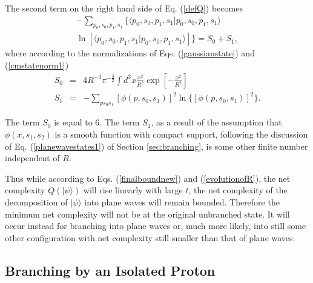 \documentclass[12pt,amsmath,amssymb,onecolumn]{revtex4-2}
\begin{document}
The second term on the right hand side of Eq. (\ref{defQ}) becomes
\begin{multline}
\label{entropy}
-\sum_{p_0, s_0, p_1, s_1} \{  \langle  p_0, s_0, p_1, s_1| p_0, s_0, p_1, s_1 \rangle  \\ \ln [  \langle  p_0, s_0, p_1, s_1| p_0, s_0, p_1,s_1 \rangle ] \} = 
S_0 + S_1,
\end{multline}
where according to the normalizations of Eqs. (\ref{gaussianstate}) and (\ref{cmstatenorm1})
\begin{subequations}
\begin{eqnarray}
\label{s0}
S_0 & = & 4 R^{-3} \pi^{-\frac{3}{2}} \int d^3 x \frac{x^2}{R^2}\exp[ -\frac{x^2}{R^2}] \\
\label{s1}
S_1 & = & -\sum_{p s_0 s_1} [ \phi( p, s_0, s_1)]^2 \ln\{ [ \phi( p, s_0, s_1)]^2 \}.
\end{eqnarray}
\end{subequations}

The term $S_0$ is equal to $6$. The term $S_1$, as a result of the assumption that $\phi( x, s_1, s_2)$ is 
a smooth function with compact support, following the discussion of Eq. (\ref{planewavestates1}) of Section \ref{sec:branching},
is some other finite number independent of $R$.

Thus while according to Eqs. (\ref{finalboundnew}) and (\ref{evolutionofR}), the net complexity $Q( |\psi \rangle )$ 
will rise linearly with large $t$, 
the net complexity of the decomposition of $|\psi \rangle $ into plane waves will remain bounded. Therefore
the minimum net complexity will not be at the original unbranched state. 
It will occur instead for branching into plane waves or, much more likely, into still some other
configuration with net complexity still smaller than that of plane waves.


\subsection{\label{sec:hadronbranching} Branching by an Isolated Proton}
\end{document}
